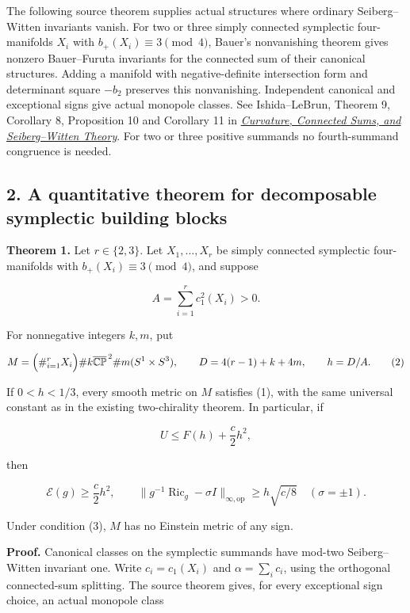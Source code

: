 \documentclass[
  10pt,
]{article}
\begin{document}
The following source theorem supplies actual structures where ordinary
Seiberg--Witten invariants vanish. For two or three simply connected
symplectic four-manifolds \(X_i\) with \(b_+(X_i)\equiv3\pmod4\),
Bauer's nonvanishing theorem gives nonzero Bauer--Furuta invariants for
the connected sum of their canonical structures. Adding a manifold with
negative-definite intersection form and determinant square \(-b_2\)
preserves this nonvanishing. Independent canonical and exceptional signs
give actual monopole classes. See Ishida--LeBrun, Theorem 9, Corollary
8, Proposition 10 and Corollary 11 in
\href{https://arxiv.org/html/math/0111228}{\emph{Curvature, Connected
Sums, and Seiberg--Witten Theory}}. For two or three positive summands
no fourth-summand congruence is needed.

\hypertarget{a-quantitative-theorem-for-decomposable-symplectic-building-blocks}{%
\subsection{2. A quantitative theorem for decomposable symplectic
building
blocks}\label{a-quantitative-theorem-for-decomposable-symplectic-building-blocks}}

\textbf{Theorem 1.} Let \(r\in\{2,3\}\). Let \(X_1,\ldots,X_r\) be
simply connected symplectic four-manifolds with
\(b_+(X_i)\equiv3\pmod4\), and suppose

\[
 A=\sum_{i=1}^r c_1^2(X_i)>0.
\]

For nonnegative integers \(k,m\), put

\[
 M=\Bigl(\#_{i=1}^r X_i\Bigr)
       \# k\overline{\mathbb{CP}}^{\,2}
       \# m(S^1\times S^3),\qquad
 D=4(r-1)+k+4m,\qquad h=D/A.
 \tag{2}
\]

If \(0<h<1/3\), every smooth metric on \(M\) satisfies (1), with the
same universal constant as in the existing two-chirality theorem. In
particular, if

\[
 U\le F(h)+\frac c2h^2,
 \tag{3}
\]

then

\[
 \mathcal E(g)\ge\frac c2h^2,
 \qquad
 \|g^{-1}\operatorname{Ric}_g-\sigma I\|_{\infty,\mathrm{op}}
       \ge h\sqrt{c/8}\quad(\sigma=\pm1).
 \tag{4}
\]

Under condition (3), \(M\) has no Einstein metric of any sign.

\textbf{Proof.} Canonical classes on the symplectic summands have
mod-two Seiberg--Witten invariant one. Write \(c_i=c_1(X_i)\) and
\(\alpha=\sum_i c_i\), using the orthogonal connected-sum splitting. The
source theorem gives, for every exceptional sign choice, an actual
monopole class
\end{document}
